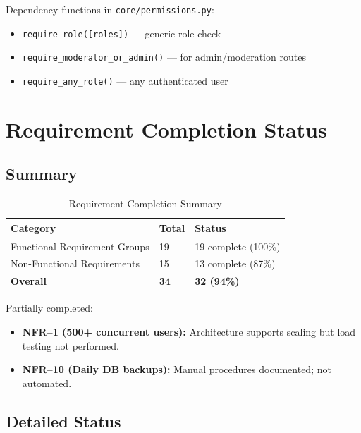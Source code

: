 \documentclass[11pt,a4paper]{report}
\begin{document}
Dependency functions in \texttt{core/permissions.py}:
\begin{itemize}
    \item \texttt{require\_role([roles])} --- generic role check
    \item \texttt{require\_moderator\_or\_admin()} --- for admin/moderation routes
    \item \texttt{require\_any\_role()} --- any authenticated user
\end{itemize}

\chapter{Requirement Completion Status}

\section{Summary}

\begin{table}[h]
    \centering
    \begin{tabularx}{\textwidth}{|l|X|X|}
        \hline
        \textbf{Category}             & \textbf{Total} & \textbf{Status}     \\
        \hline
        Functional Requirement Groups & 19             & 19 complete (100\%) \\
        \hline
        Non-Functional Requirements   & 15             & 13 complete (87\%)  \\
        \hline
        \textbf{Overall}              & \textbf{34}    & \textbf{32 (94\%)}  \\
        \hline
    \end{tabularx}
    \caption{Requirement Completion Summary}
\end{table}

Partially completed:
\begin{itemize}
    \item \textbf{NFR--1 (500+ concurrent users):} Architecture supports scaling but load testing not performed.
    \item \textbf{NFR--10 (Daily DB backups):} Manual procedures documented; not automated.
\end{itemize}

\section{Detailed Status}
\end{document}
